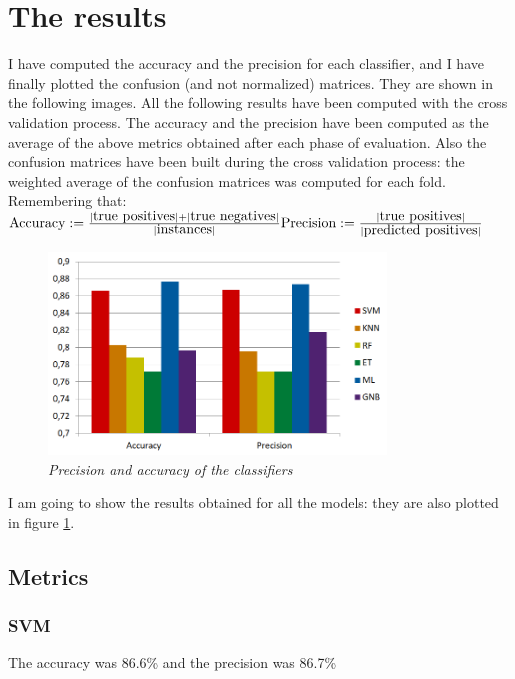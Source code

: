 \documentclass[12pt]{article}
\begin{document}
\section{The results}
\label{sec:results}
I have computed the accuracy and the precision for each classifier, and I have finally plotted the confusion (and not normalized) matrices. They are shown in the following images. All the following results have been computed with the cross validation process. The accuracy and the precision have been computed as the average of the above metrics obtained after each phase of evaluation. Also the confusion matrices have been built during the cross validation process: the weighted average of the confusion matrices was computed for each fold. Remembering that:
$
\newline\newline
\mbox{Accuracy}:= \frac{|\mbox{true positives}| + |\mbox{true negatives}|}{|\mbox{instances}|}
\newline\newline
\mbox{Precision}:= \frac{|\mbox{true positives}|}{|\mbox{predicted positives}|}
\newline\newline
$

\begin{figure}[!htb]
	\centering %
	\includegraphics[width=0.8\textwidth]{metrics.png} %
	\caption{\textit{Precision and accuracy of the classifiers}} %
	\label{fig:metrics}
\end{figure}

I am going to show the results obtained for all the models: they are also plotted in figure \ref{fig:metrics}.
\subsection{Metrics}

\subsubsection{SVM}
The accuracy was 86.6\% and the precision was 86.7\%
\end{document}
